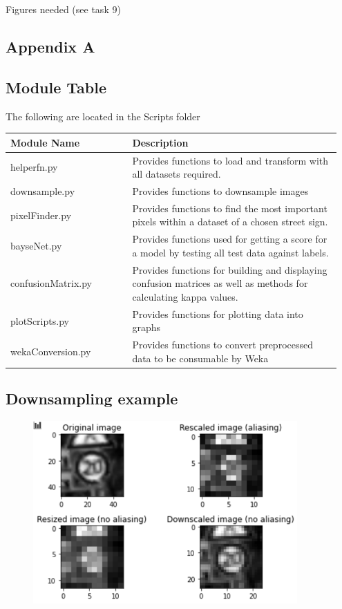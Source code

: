 \documentclass[11pt]{article}
\begin{document}
\huge Figures needed (see task 9)

\pagebreak
\appendix
\appendixpage
\addappheadtotoc
\begin{appendices}
\section{Appendix A}
\subsection{Module Table}\label{tab:moduleTable}
The following are located in the Scripts folder
\begin{table}[ht]
    \centering
    \begin{tabular}{|p{0.35\linewidth} | p{0.6\linewidth}|} 
      \hline
      \textbf{Module Name}  & \textbf{Description} \\ \hline
      helperfn.py & Provides functions to load and transform with all datasets required. \\ \hline
      downsample.py & Provides functions to downsample images  \\ \hline
      pixelFinder.py & Provides functions to find the most important pixels within a dataset of a chosen street sign. \\ \hline
      bayseNet.py & Provides functions used for getting a score for a model by testing all test data against labels. \\ \hline
      confusionMatrix.py & Provides functions for building and displaying confusion matrices as well as methods for calculating kappa values. \\ \hline
      plotScripts.py & Provides functions for plotting data into graphs \\ \hline
      wekaConversion.py & Provides functions to convert preprocessed data to be consumable by Weka\\
      \hline
    \end{tabular}
\end{table}

\subsection{Downsampling example}\label{fig:downsampleExample}
\begin{figure}[H]
    \centering
    \includegraphics[width=0.9\textwidth]{Images/downsample_example.png}
\end{figure}


\end{appendices}
\end{document}
